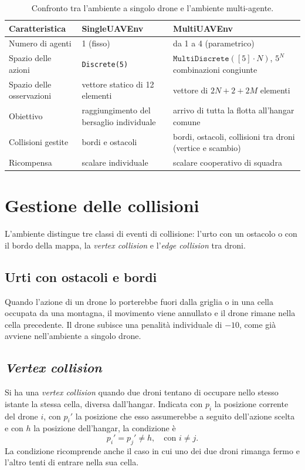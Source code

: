 \documentclass[12pt,a4paper,twoside]{report}
\newcommand{\fonte}[1][elaborazione propria]{\par\vspace{3pt}{\footnotesize\emph{Fonte: #1.}}}
\begin{document}
\begin{table}[htbp]
    \centering
    \begin{tabularx}{\textwidth}{l X X}
        \toprule
        \textbf{Caratteristica} & \textbf{SingleUAVEnv} & \textbf{MultiUAVEnv} \\
        \midrule
        Numero di agenti          & 1 (fisso) & da 1 a 4 (parametrico) \\
        Spazio delle azioni       & \texttt{Discrete(5)} & $\texttt{MultiDiscrete}([5] \cdot N)$, $5^N$ combinazioni congiunte \\
        Spazio delle osservazioni & vettore statico di 12 elementi & vettore di $2N + 2 + 2M$ elementi \\
        Obiettivo                 & raggiungimento del bersaglio individuale & arrivo di tutta la flotta all'hangar comune \\
        Collisioni gestite        & bordi e ostacoli & bordi, ostacoli, collisioni tra droni (vertice e scambio) \\
        Ricompensa                & scalare individuale & scalare cooperativo di squadra \\
        \bottomrule
    \end{tabularx}
    \caption{Confronto tra l'ambiente a singolo drone e l'ambiente multi-agente.}
    \label{tab:3_2}
    \fonte
\end{table}

\section{Gestione delle collisioni}
\label{sec:gestione_collisioni}

L'ambiente distingue tre classi di eventi di collisione: l'urto con un ostacolo o con il bordo della mappa, la \emph{vertex collision} e l'\emph{edge collision} tra droni.

\subsection{Urti con ostacoli e bordi}
Quando l'azione di un drone lo porterebbe fuori dalla griglia o in una cella occupata da una montagna, il movimento viene annullato e il drone rimane nella cella precedente. Il drone subisce una penalità individuale di $-10$, come già avviene nell'ambiente a singolo drone.
\newpage
\subsection{\emph{Vertex collision}}
Si ha una \emph{vertex collision} quando due droni tentano di occupare nello stesso istante la stessa cella, diversa dall'hangar. Indicata con $p_i$ la posizione corrente del drone $i$, con $p_i'$ la posizione che esso assumerebbe a seguito dell'azione scelta e con $h$ la posizione dell'hangar, la condizione è
\[
p_i' = p_j' \neq h, \quad \text{con } i \neq j.
\]
La condizione ricomprende anche il caso in cui uno dei due droni rimanga fermo e l'altro tenti di entrare nella sua cella.
\end{document}

